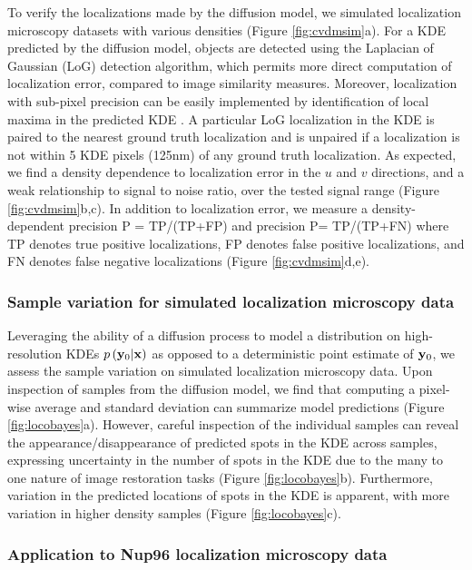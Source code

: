 To verify the localizations made by the diffusion model, we simulated localization microscopy datasets with various densities (Figure \ref{fig:cvdmsim}a). For a KDE predicted by the diffusion model, objects are detected using the Laplacian of Gaussian (LoG) detection algorithm, which permits more direct computation of localization error, compared to image similarity measures. Moreover, localization with sub-pixel precision can be easily implemented by identification of local maxima in the predicted KDE \parencite{Nehme2020}. A particular LoG localization in the KDE is paired to the nearest ground truth localization and is unpaired if a localization is not within 5 KDE pixels (125nm) of any ground truth localization. As expected, we find a density dependence to localization error in the $u$ and $v$ directions, and a weak relationship to signal to noise ratio, over the tested signal range (Figure \ref{fig:cvdmsim}b,c). In addition to localization error, we measure a density-dependent precision P = TP/(TP+FP) and precision P= TP/(TP+FN) where TP denotes true positive localizations, FP denotes false positive localizations, and FN denotes false negative localizations (Figure \ref{fig:cvdmsim}d,e). 

\subsubsection{Sample variation for simulated localization microscopy data}

Leveraging the ability of a diffusion process to model a distribution on high-resolution KDEs $p\left(\bold{y}_0\lvert \bold{x}\right)$ as opposed to a deterministic point estimate of $\bold{y}_0$, we assess the sample variation on simulated localization microscopy data. Upon inspection of samples from the diffusion model, we find that computing a pixel-wise average and standard deviation can summarize model predictions (Figure \ref{fig:locobayes}a). However, careful inspection of the individual samples can reveal the appearance/disappearance of predicted spots in the KDE across samples, expressing uncertainty in the number of spots in the KDE due to the many to one nature of image restoration tasks (Figure \ref{fig:locobayes}b). Furthermore, variation in the predicted locations of spots in the KDE is apparent, with more variation in higher density samples (Figure \ref{fig:locobayes}c). 

\subsubsection{Application to Nup96 localization microscopy data}

